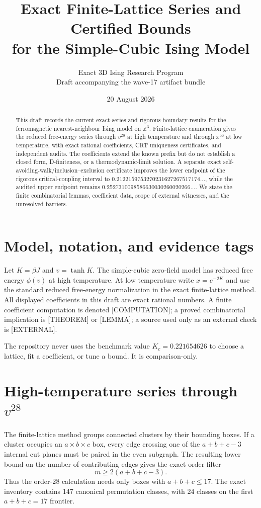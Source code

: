 \documentclass[11pt]{article}
\title{Exact Finite-Lattice Series and Certified Bounds\\for the Simple-Cubic Ising Model}
\author{Exact 3D Ising Research Program\\\small Draft accompanying the wave-17 artifact bundle}
\date{20 August 2026}
\begin{document}
\maketitle
\begin{abstract}
This draft records the current exact-series and rigorous-boundary results for the ferromagnetic nearest-neighbour Ising model on $\mathbb Z^3$.  Finite-lattice enumeration gives the reduced free-energy series through $v^{28}$ at high temperature and through $x^{56}$ at low temperature, with exact rational coefficients, CRT uniqueness certificates, and independent audits.  The coefficients extend the known prefix but do not establish a closed form, D-finiteness, or a thermodynamic-limit solution.  A separate exact self-avoiding-walk/inclusion--exclusion certificate improves the lower endpoint of the rigorous critical-coupling interval to $0.2122159753270231627267517174\ldots$, while the audited upper endpoint remains $0.2527310098586630030260020266\ldots$.  We state the finite combinatorial lemmas, coefficient data, scope of external witnesses, and the unresolved barriers.
\end{abstract}

\section{Model, notation, and evidence tags}
Let $K=\beta J$ and $v=\tanh K$.  The simple-cubic zero-field model has reduced free energy $\phi(v)$ at high temperature.  At low temperature write $x=e^{-2K}$ and use the standard reduced free-energy normalization in the exact finite-lattice method.  All displayed coefficients in this draft are exact rational numbers.  A finite coefficient computation is denoted [COMPUTATION]; a proved combinatorial implication is [THEOREM] or [LEMMA]; a source used only as an external check is [EXTERNAL].

The repository never uses the benchmark value $K_c=0.221654626$ to choose a lattice, fit a coefficient, or tune a bound.  It is comparison-only.

\section{High-temperature series through $v^{28}$}
The finite-lattice method groups connected clusters by their bounding boxes.  If a cluster occupies an $a\times b\times c$ box, every edge crossing one of the $a+b+c-3$ internal cut planes must be paired in the even subgraph.  The resulting lower bound on the number of contributing edges gives the exact order filter
\[
 m\ge 2(a+b+c-3).
\]
Thus the order-$28$ calculation needs only boxes with $a+b+c\le17$. The exact inventory contains 147 canonical permutation classes, with 24 classes on the first $a+b+c=17$ frontier.
\end{document}
